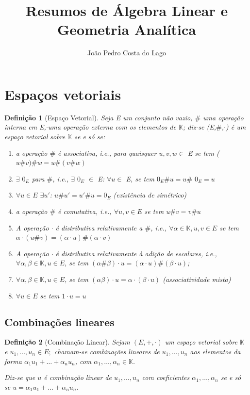 \documentclass{article}
\title{Resumos de Álgebra Linear e Geometria Analítica}
\author{João Pedro Costa do Lago}
\newtheorem{definition}{Definição}[section]
\begin{document}
\maketitle

\section{Espaços vetoriais}
	\begin{definition}[Espaço Vetorial]
		Seja E um conjunto não vazio, $\#$ uma operação interna em E,$\cdot$uma operação externa com os elementos de $\mathbb{K}$; diz-se (E,$\#$,$\cdot$) é um espaço vetorial sobre $\mathbb{K}$ se e só se:

		\begin{enumerate}
			\item a operação $\#$ é associativa, i.e., para quaisquer $u, v, w \in$ E se tem ($u\#v)\#w=u\#(v\#w)$

			\item  $\exists$ $0_E$ para $\#$, i.e., $\exists$ $0_E$ $\in$ E: $\forall u \in$ E, se tem $0_E\#u=u\#$ $0_E=u$

			\item $\forall u\in E $   $\exists u'$: $u\#u'=u'\#u=0_E$ (existência de simétrico)

			\item a operação $\#$ é comutativa, i.e., $\forall u,v \in E $ se tem $u\# v= v\# u$

			\item  A operação $\cdot$ é distributiva relativamente a $\#$, i.e., $\forall \alpha \in \mathbb{K}, u,v \in E$ se tem $\alpha \cdot(u \# v)=(\alpha \cdot u) \#(\alpha \cdot v)$

			\item  A operação $\cdot$ é distributiva relativamente à adição de escalares, i.e., $\forall \alpha ,\beta \in \mathbb{K}, u \in E$, se tem $(\alpha \# \beta)\cdot u=(\alpha \cdot u)\#(\beta\cdot u)$; 

			\item $\forall \alpha, \beta \in \mathbb{K}, u \in E$, se tem $(\alpha \beta) \cdot u=\alpha \cdot (\beta \cdot u)$ (associatividade mista)

			\item $\forall u \in E$ se tem $1\cdot u=u$

		\end{enumerate}
	\end{definition}

\subsection{Combinações lineares}
	\begin{definition}[Combinação Linear]
Sejam $(E,+,\cdot)$ um espaço vetorial sobre $\mathbb{K}$ e $u_1,\dots,u_n \in E;$ chamam-se combinações lineares de $u_1,\dots,u_n$ aos elementos da forma $\alpha_1 u_1+\dots+\alpha_n u_n$, com $\alpha_1,\dots, \alpha_n \in \mathbb{K}$.

Diz-se que $u$ é combinação linear de $u_1,\dots,u_n$ com coeficientes $\alpha_1,\dots,\alpha_n$ se e só se $u=\alpha_1 u_1+\dots +\alpha_n u_n$. 

	\end{definition}
\end{document}
